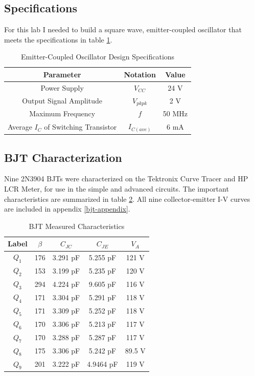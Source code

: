 \documentclass[titlepage, letterpaper, 10.5pt]{article}
\begin{document}
\subsection{Specifications}

For this lab I needed to build a square wave, emitter-coupled oscillator
that meets the specifications in table \ref{specs-table}.

\begin{table}[ht]
\centering
\caption{Emitter-Coupled Oscillator Design Specifications}
\begin{tabular}{c | c | c}
\hline\hline
Parameter	&Notation	&Value	\\
\hline\hline
Power Supply	&$V_{CC}$	&24 V	\\
Output Signal Amplitude	&$V_{pkpk}$	&2 V	\\
Maximum Frequency	&$f$	&50 MHz	\\
Average $I_{C}$ of Switching Transistor	&$I_{C(ave)}$	&6 mA	\\
\hline\hline
\end{tabular}
\label{specs-table}
\end{table}

\subsection{BJT Characterization}

Nine 2N3904 BJTs were characterized on the Tektronix Curve Tracer and HP LCR Meter,
for use in the simple and advanced circuits. The important
characteristics are summarized in table \ref{bjt-characteristics-table}.
All nine collector-emitter I-V curves are included in appendix
\ref{bjt-appendix}.

\begin{table}[ht]
\centering
\caption{BJT Measured Characteristics}
\begin{tabular}{c | c | c | c | c}
\hline\hline
Label	&$\beta$	&$C_{JC}$	&$C_{JE}$	&$V_{A}$	\\
\hline\hline
$Q_{1}$	&176	&3.291 pF	&5.255 pF	&121 V	\\
$Q_{2}$	&153	&3.199 pF	&5.235 pF	&120 V	\\
$Q_{3}$	&294	&4.224 pF	&9.605 pF	&116 V	\\
$Q_{4}$	&171	&3.304 pF	&5.291 pF	&118 V	\\
$Q_{5}$	&171	&3.309 pF	&5.252 pF	&118 V	\\
$Q_{6}$	&170	&3.306 pF	&5.213 pF	&117 V	\\
$Q_{7}$	&170	&3.288 pF	&5.287 pF	&117 V	\\
$Q_{8}$	&175	&3.306 pF	&5.242 pF	&89.5 V	\\
$Q_{9}$	&201	&3.222 pF	&4.9464 pF	&119 V	\\
\hline\hline
\end{tabular}
\label{bjt-characteristics-table}
\end{table}
\end{document}
